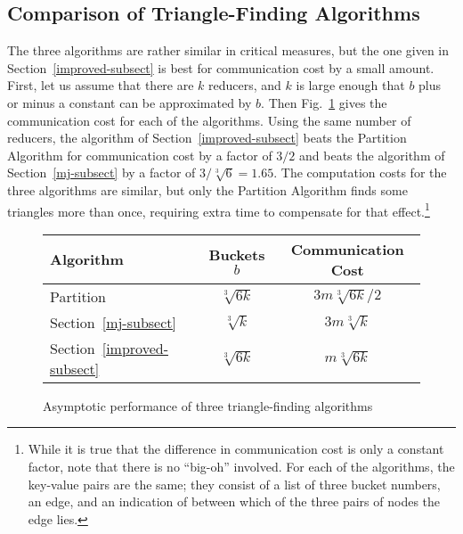 \subsection{Comparison of Triangle-Finding Algorithms}
\label{tri-compare-subsect}

The three algorithms are rather similar in critical measures, but the one given in Section~\ref{improved-subsect} is best for communication cost by a small amount.  First, let us assume that there are $k$ reducers, and $k$ is large enough that $b$ plus or minus a constant can be approximated by $b$.  Then Fig.~\ref{asymp-fig} gives the communication cost for each of the algorithms.
Using the same number of reducers, the algorithm of Section~\ref{improved-subsect} beats the Partition Algorithm for communication cost by a factor of $3/2$ and beats the algorithm of Section~\ref{mj-subsect} by a factor of $3/\sqrt[3]{6} = 1.65$.
The computation costs for the three algorithms are similar, but only the Partition Algorithm finds some triangles more than once, requiring extra time to compensate for that effect.\footnote{While it is true that the difference in communication cost is only a constant factor, note that there is no ``big-oh'' involved.  For each of the algorithms, the key-value pairs are the same; they consist of a list of three bucket numbers, an edge, and an indication of between which of the three pairs of nodes the edge lies.}

\begin{figure}[htfb]

\begin{center}
\begin{tabular}{| l || c | c|}
\hline
Algorithm & Buckets $b$ & Communication Cost\\
\hline\hline
Partition & $\sqrt[3]{6k}$ & $3m\sqrt[3]{6k}/2$\\
\hline
Section~\ref{mj-subsect} & $\sqrt[3]{k}$ & $3m\sqrt[3]{k}$\\
\hline
Section~\ref{improved-subsect} & $\sqrt[3]{6k}$ & $m\sqrt[3]{6k}$\\
\hline

\end{tabular}
\end{center}

\caption{Asymptotic performance of three triangle-finding algorithms}
\label{asymp-fig}

\end{figure}


